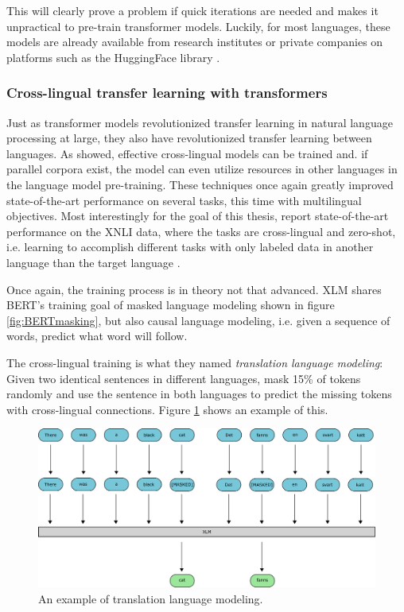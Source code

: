 \documentclass[nofilelist]{cslthse-msc}
\begin{document}
This will clearly prove a problem if quick iterations are needed and makes it unpractical to pre-train transformer models. Luckily, for most languages, these models are already available from research institutes or private companies on platforms such as the HuggingFace library \citep{Wolf2019HuggingFacesTS}.

\subsubsection{Cross-lingual transfer learning with transformers}

Just as transformer models revolutionized transfer learning in natural language processing at large, they also have revolutionized transfer learning between languages. As \citet{DBLP:journals/corr/abs-1901-07291} showed, effective cross-lingual models can be trained and. if parallel corpora exist, the model can even utilize resources in other languages in the language model pre-training. These techniques once again greatly improved state-of-the-art performance on several tasks, this time with multilingual objectives. Most interestingly for the goal of this thesis, \citeauthor{DBLP:journals/corr/abs-1901-07291}  report state-of-the-art performance on the XNLI data, where the tasks are cross-lingual and zero-shot, i.e. learning to accomplish different tasks with only labeled data in another language than the target language \citep{DBLP:journals/corr/abs-1809-05053}.

Once again, the training process is in theory not that advanced. XLM shares BERT's training goal of masked language modeling shown in figure \ref{fig:BERTmasking}, but also causal language modeling, i.e. given a sequence of words, predict what word will follow.

The cross-lingual training is what they named \emph{translation language modeling}: Given two identical sentences in different languages, mask 15\% of tokens randomly and use the sentence in both languages to predict the missing tokens with cross-lingual connections. Figure \ref{fig:TLM} shows an example of this.

\begin{figure}[ht]
    \centering
    \includegraphics[width=\textwidth]{LTMmasking.pdf}
    \caption{An example of translation language modeling.}
    \label{fig:TLM}
\end{figure}
\end{document}
